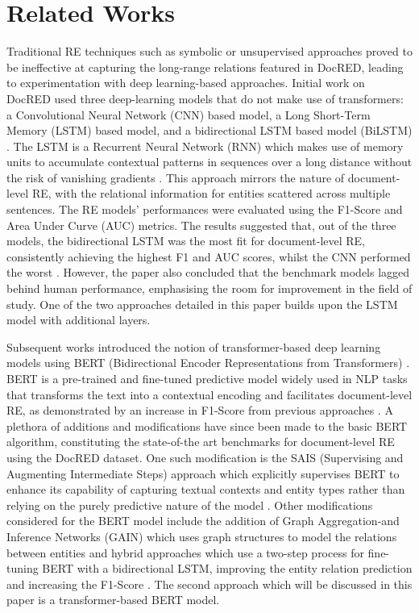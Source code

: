 \documentclass[conference]{IEEEtran}
\begin{document}
\section{Related Works}

Traditional RE techniques such as symbolic or unsupervised approaches proved to be ineffective at capturing the long-range relations featured in DocRED, leading to experimentation with deep learning-based approaches. Initial work on DocRED used three deep-learning models that do not make use of transformers: a Convolutional Neural Network (CNN) based model, a Long Short-Term Memory (LSTM) based model, and a bidirectional LSTM based model (BiLSTM) \cite{yao2019docred}. The LSTM is a Recurrent Neural Network (RNN) which makes use of memory units to accumulate contextual patterns in sequences over a long distance without the risk of vanishing gradients \cite{cai2016bidirectional}. This approach mirrors the nature of document-level RE, with the relational information for entities scattered across multiple sentences. The RE models' performances were evaluated using the F1-Score and Area Under Curve (AUC) metrics. The results suggested that, out of the three models, the bidirectional LSTM was the most fit for document-level RE, consistently achieving the highest F1 and AUC scores, whilst the CNN performed the worst \cite{yao2019docred}. However, the paper also concluded that the benchmark models lagged behind human performance, emphasising the room for improvement in the field of study. One of the two approaches detailed in this paper builds upon the LSTM model with additional layers. 

Subsequent works introduced the notion of transformer-based deep learning models using BERT (Bidirectional Encoder Representations from Transformers) \cite{han2020novel}. BERT is a pre-trained and fine-tuned predictive model widely used in NLP tasks that transforms the text into a contextual encoding and facilitates document-level RE, as demonstrated by an increase in F1-Score from previous approaches \cite{devlin2018bert}\cite{han2020novel}. A plethora of additions and modifications have since been made to the basic BERT algorithm, constituting the state-of-the art benchmarks for document-level RE using the DocRED dataset. One such modification is the SAIS (Supervising and Augmenting Intermediate Steps) approach which explicitly supervises BERT to enhance its capability of capturing textual contexts and entity types rather than relying on the purely predictive nature of the model \cite{xiao2021sais}. Other modifications considered for the BERT model include the addition of Graph Aggregation-and Inference Networks (GAIN) which uses graph structures to model the relations between entities \cite{zeng2020double} and hybrid approaches which use a two-step process for fine-tuning BERT with a bidirectional LSTM, improving the entity relation prediction and increasing the F1-Score \cite{wang2019fine}. The second approach which will be discussed in this paper is a transformer-based BERT model.
\end{document}
